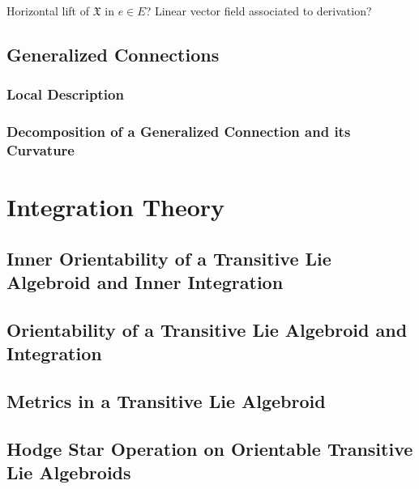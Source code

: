 \documentclass[12pt]{report}
\theoremstyle{definition}
\begin{document}
Horizontal lift of $\mathfrak{X}$ in $e\in E$? Linear vector field associated to derivation?


\section{Generalized Connections}
\subsection{Local Description}
\subsection{Decomposition of a Generalized Connection and its Curvature}

\chapter{Integration Theory}\label{chp:integration}


\section{Inner Orientability of a Transitive Lie Algebroid and Inner Integration}

\section{Orientability of a Transitive Lie Algebroid and Integration}

\section{Metrics in a Transitive Lie Algebroid}

\section{Hodge Star Operation on Orientable Transitive Lie Algebroids}
\end{document}
